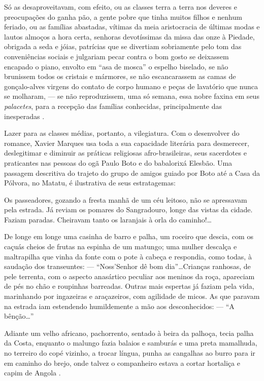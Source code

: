 \begin{citacao}
Só as desaproveitavam, com efeito, ou as classes terra a terra nos deveres e preocupações do ganha pão, a gente pobre que tinha muitos filhos e nenhum feriado, ou as famílias abastadas, vítimas da meia aristocracia de últimas modas e lautos almoços a hora certa, senhoras devotíssimas da missa das onze à Piedade, obrigada a seda e jóias, patrícias que se divertiam sobriamente pelo tom das conveniências sociais e julgariam pecar contra o bom gosto se deixassem encapado o piano, envolto em ``asa de mosca'' o espelho biselado, se não brunissem todos os cristais e mármores, se não escancarassem as camas de gonçalo-alves virgens do contato de corpo humano e peças de lavatório que nunca se molharam, --- se não reproduzissem, uma só semana, essa nobre faxina em seus \textit{palacetes}, para a recepção das famílias conhecidas, principalmente das inesperadas \cite[pp.~4-5]{marques_feiticeiro_1975}.
\end{citacao}

Lazer para as classes médias, portanto, a vilegiatura. Com o desenvolver do romance, Xavier Marques usa toda a sua capacidade literária para desmerecer, deslegitimar e diminuir as práticas religiosas afro-brasileiras, seus sacerdotes e praticantes nas pessoas do ogã Paulo Boto e do babalorixá Elesbão. Uma passagem descritiva do trajeto do grupo de amigos guiado por Boto até a Casa da Pólvora, no Matatu, é ilustrativa de seus estratagemas:

\begin{citacao}
Os passeadores, gozando a fresta manhã de um céu leitoso, não se apressavam pela estrada. Já reviam os pomares do Sangradouro, longe das vistas da cidade. Faziam paradas. Cheiravam tanto os laranjais à orla do caminho!\dots

De longe em longe uma casinha de barro e palha, um roceiro que descia, com os caçuás cheios de frutas na espinha de um matungo; uma mulher descalça e maltrapilha que vinha da fonte com o pote à cabeça e respondia, como todas, à saudação dos transeuntes: --- ``Noss'Senhor dê bom dia''\dots Crianças ranhosas, de pele terrenta, com o aspecto anasártico peculiar aos meninos da roça, apareciam de pés no chão e roupinhas barreadas. Outras mais espertas já faziam pela vida, marinhando por ingazeiras e araçazeiros, com agilidade de micos. As que paravam na estrada iam estendendo humildemente a mão aos desconhecidos: --- ``A bênção\dots''

Adiante um velho africano, pachorrento, sentado à beira da palhoça, tecia palha da Costa, enquanto o malungo fazia balaios e samburás e uma preta mamalhuda, no terreiro do copé vizinho, a trocar língua, punha as cangalhas ao burro para ir em caminho do brejo, onde talvez o companheiro estava a cortar hortaliça e capim de Angola \cite[pp.~4-5]{marques_feiticeiro_1975}.
\end{citacao}

